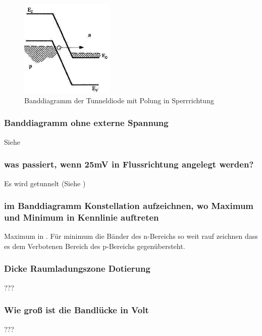     \begin{figure}[H]
        \centering
        \includegraphics[width=0.4\textwidth]{fig/tunneldiodeSperrpolung}
        \caption{Banddiagramm der Tunneldiode mit Polung in Sperrrichtung}
        \label{fig:tunneldiodeSperrpolung}
    \end{figure}
    
    \subsubsection{Banddiagramm ohne externe Spannung}
    Siehe 
    \subsubsection{was passiert, wenn 25mV in Flussrichtung angelegt werden?}
    Es wird getunnelt (Siehe )
    \subsubsection{im Banddiagramm Konstellation aufzeichnen, wo Maximum und Minimum in Kennlinie auftreten}
    Maximum in . F\"ur minimum die B\"ander des n-Bereichs so weit rauf zeichnen
    dass es dem Verbotenen Bereich des p-Bereichs gegen\"ubersteht.
    \subsubsection{Dicke Raumladungszone Dotierung}
    ???
    \subsubsection{Wie groß ist die Bandlücke in Volt}
    ???
